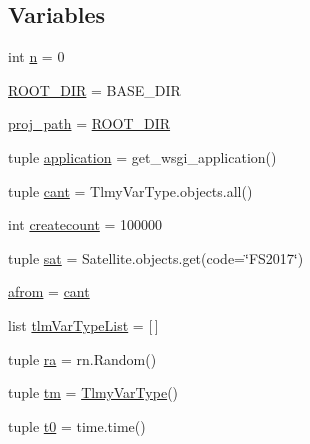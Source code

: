 \subsection*{Variables}
\begin{DoxyCompactItemize}
\item 
int \hyperlink{namespace_simulators_1_1_telemetry_processor_adc73b3fce91792369a602ff747603555}{n} = 0
\item 
\hyperlink{namespace_simulators_1_1_telemetry_processor_a8c49f30b06ce8e1d4f1cb129990137f0}{R\+O\+O\+T\+\_\+\+D\+I\+R} = B\+A\+S\+E\+\_\+\+D\+I\+R
\item 
\hyperlink{namespace_simulators_1_1_telemetry_processor_a9d556f1e0ebadc73e343a76eec24be68}{proj\+\_\+path} = \hyperlink{namespace_simulators_1_1_telemetry_processor_a8c49f30b06ce8e1d4f1cb129990137f0}{R\+O\+O\+T\+\_\+\+D\+I\+R}
\item 
tuple \hyperlink{namespace_simulators_1_1_telemetry_processor_a5febb933bf5e066cf21cae50f488f344}{application} = get\+\_\+wsgi\+\_\+application()
\item 
tuple \hyperlink{namespace_simulators_1_1_telemetry_processor_abc826fa3560eab24e061626347bca797}{cant} = Tlmy\+Var\+Type.\+objects.\+all()
\item 
int \hyperlink{namespace_simulators_1_1_telemetry_processor_a4c9006577ee9d8c413d6101dff7d6f4a}{createcount} = 100000
\item 
tuple \hyperlink{namespace_simulators_1_1_telemetry_processor_a0853713b806ec7ae27394839316688a4}{sat} = Satellite.\+objects.\+get(code=\char`\"{}F\+S2017\char`\"{})
\item 
\hyperlink{namespace_simulators_1_1_telemetry_processor_a9d4a2dfca542d1b8b21e429e2d0678a6}{afrom} = \hyperlink{namespace_simulators_1_1_telemetry_processor_abc826fa3560eab24e061626347bca797}{cant}
\item 
list \hyperlink{namespace_simulators_1_1_telemetry_processor_a55a89e1c665ed41a1547f8d4532e524e}{tlm\+Var\+Type\+List} = \mbox{[}$\,$\mbox{]}
\item 
tuple \hyperlink{namespace_simulators_1_1_telemetry_processor_aba1ed44c3244daa9240167e6b3b375b4}{ra} = rn.\+Random()
\item 
tuple \hyperlink{namespace_simulators_1_1_telemetry_processor_a534cc8f0eed75a7ae421b8bde43586f9}{tm} = \hyperlink{class_ground_segment_1_1models_1_1_tlmy_var_type_1_1_tlmy_var_type}{Tlmy\+Var\+Type}()
\item 
tuple \hyperlink{namespace_simulators_1_1_telemetry_processor_a8856d395177605add01698b1a6a13c0a}{t0} = time.\+time()

\end{DoxyCompactItemize}
